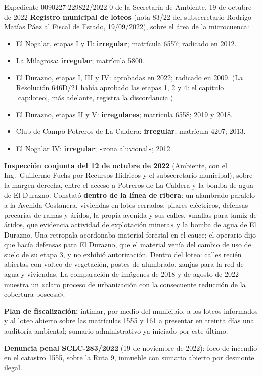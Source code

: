 \begin{ficha}{Expediente 0090227-229822/2022-0 de la Secretaría de Ambiente, 19 de octubre de 2022}
\textbf{Registro municipal de loteos} (nota 83/22 del subsecretario Rodrigo Matías Páez al Fiscal de Estado, 19/09/2022), sobre el área de la microcuenca:
\begin{itemize}[leftmargin=*,nosep]
\item El Nogalar, etapas I y II: \textbf{irregular}; matrícula 6557; radicado en 2012.
\item La Milagrosa: \textbf{irregular}; matrícula 5800.
\item El Durazno, etapas I, III y IV: aprobadas en 2022; radicado en 2009. (La Resolución 646D/21 había aprobado las etapas 1, 2 y 4: el capítulo \ref{cap:loteo}, más adelante, registra la discordancia.)
\item El Durazno, etapas II y V: \textbf{irregulares}; matrícula 6558; 2019 y 2018.
\item Club de Campo Potreros de La Caldera: \textbf{irregular}; matrícula 4207; 2013.
\item El Nogalar IV: \textbf{irregular}; «zona aluvional»; 2012.
\end{itemize}

\textbf{Inspección conjunta del 12 de octubre de 2022} (Ambiente, con el Ing.\ Guillermo Fuchs por Recursos Hídricos y el subsecretario municipal), sobre la margen derecha, entre el acceso a Potreros de La Caldera y la bomba de agua de El Durazno. Constató \textbf{dentro de la línea de ribera}: un alambrado paralelo a la Avenida Costanera, viviendas en lotes cerrados, pilares eléctricos, defensas precarias de ramas y áridos, la propia avenida y sus calles, «mallas para tamiz de áridos, que evidencia actividad de explotación minera» y la bomba de agua de El Durazno. Una retropala acordonaba material forestal en el cauce; el operario dijo que hacía defensas para El Durazno, que el material venía del cambio de uso de suelo de su etapa 3, y no exhibió autorización. Dentro del loteo: calles recién abiertas con volteo de vegetación, postes de alumbrado, zanjas para la red de agua y viviendas. La comparación de imágenes de 2018 y de agosto de 2022 muestra un «claro proceso de urbanización con la consecuente reducción de la cobertura boscosa».

\textbf{Plan de fiscalización:} intimar, por medio del municipio, a los loteos informados y al loteo abierto sobre las matrículas 1555 y 161 a presentar en treinta días una auditoría ambiental; sumario administrativo ya iniciado por este último.

\textbf{Denuncia penal SCLC-283/2022} (19 de noviembre de 2022): foco de incendio en el catastro 1555, sobre la Ruta 9, inmueble con sumario abierto por desmonte ilegal.
\end{ficha}

